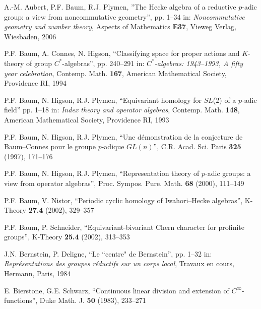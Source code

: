 \documentclass[11pt]{report}
\begin{document}









\begin{thebibliography}{99}

 A.-M. Aubert, P.F. Baum, R.J. Plymen,
''The Hecke algebra of a reductive $p$-adic group: a view from
noncommutative geometry'', pp. 1--34 in: \emph{Noncommutative
geometry and number theory}, Aspects of Mathematics \textbf{E37},
Vieweg Verlag, Wiesbaden, 2006

 P.F. Baum, A. Connes, N. Higson,
``Classifying space for proper actions and $K$-theory of 
group $C^*$-algebras'', pp. 240--291 in: 
\emph{$C^*$-algebras: 1943--1993, A fifty year celebration},
Contemp. Math. \textbf{167},
American Mathematical Society, Providence RI, 1994

 P.F. Baum, N. Higson, R.J. Plymen,
``Equivariant homology for $SL$(2) of a $p$-adic field'' 
pp. 1--18 in:  \emph{Index theory and operator algebras},
Contemp. Math. \textbf{148},
American Mathematical Society, Providence RI, 1993

 P.F. Baum, N. Higson, R.J. Plymen,
``Une d\'emonstration de la conjecture de Baum--Connes pour
le groupe $p$-adique $GL (n)$'',
C.R. Acad. Sci. Paris \textbf{325} (1997), 171--176

 P.F. Baum, N. Higson, R.J. Plymen,
``Representation theory of $p$-adic groups:
a view from operator algebras'',
Proc. Sympos. Pure. Math. \textbf{68} (2000), 111--149

 P.F. Baum, V. Nistor,
``Periodic cyclic homology of Iwahori--Hecke algebras'',
K-Theory \textbf{27.4} (2002), 329--357

 P.F. Baum, P. Schneider,
``Equivariant-bivariant Chern character for profinite groups'',
K-Theory \textbf{25.4} (2002), 313--353

 J.N. Bernstein, P. Deligne,
``Le ``centre" de Bernstein'',
pp. 1--32 in: \emph{Repr\'esentations des groupes r\'eductifs sur un corps local},
Travaux en cours,
Hermann, Paris, 1984

 E. Bierstone, G.E. Schwarz,
``Continuous linear division and extension of $C^\infty$-functions'',
Duke Math. J. \textbf{50} (1983), 233--271


\end{thebibliography}
\end{document}
